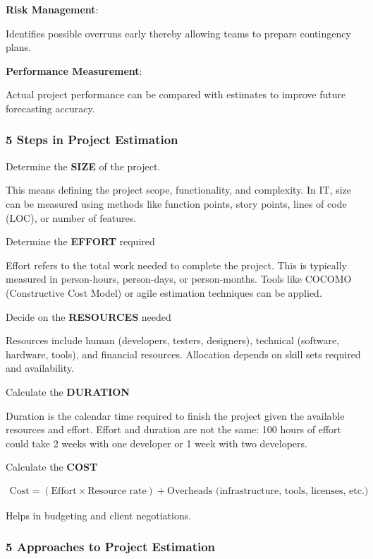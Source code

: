 \noindent\textbf{Risk Management}:

Identifies possible overruns early thereby allowing teams to prepare contingency plans.

\bigskip\textbf{Performance Measurement}:

Actual project performance can be compared with estimates to improve future forecasting accuracy.

\subsubsection{5 Steps in Project Estimation}

\indent

\step Determine the \textbf{SIZE} of the project.

This means defining the project scope, functionality, and complexity. In IT, size can be measured using methods like function points, story points, lines of code (LOC), or number of features.

\step Determine the \textbf{EFFORT} required

Effort refers to the total work needed to complete the project. This is typically measured in person-hours, person-days, or person-months. Tools like COCOMO (Constructive Cost Model) or agile estimation techniques can be applied.

\step Decide on the \textbf{RESOURCES} needed

Resources include human (developers, testers, designers), technical (software, hardware, tools), and financial resources. Allocation depends on skill sets required and availability.

\step Calculate the \textbf{DURATION}

Duration is the calendar time required to finish the project given the available resources and effort. Effort and duration are not the same: 100 hours of effort could take 2 weeks with one developer or 1 week with two developers.

\step Calculate the \textbf{COST}

\begin{align*}
    \text{Cost} = (\text{Effort}\times \text{Resource rate}) + \text{Overheads (infrastructure, tools, licenses, etc.)}
\end{align*}

Helps in budgeting and client negotiations.

\subsubsection{5 Approaches to Project Estimation}

